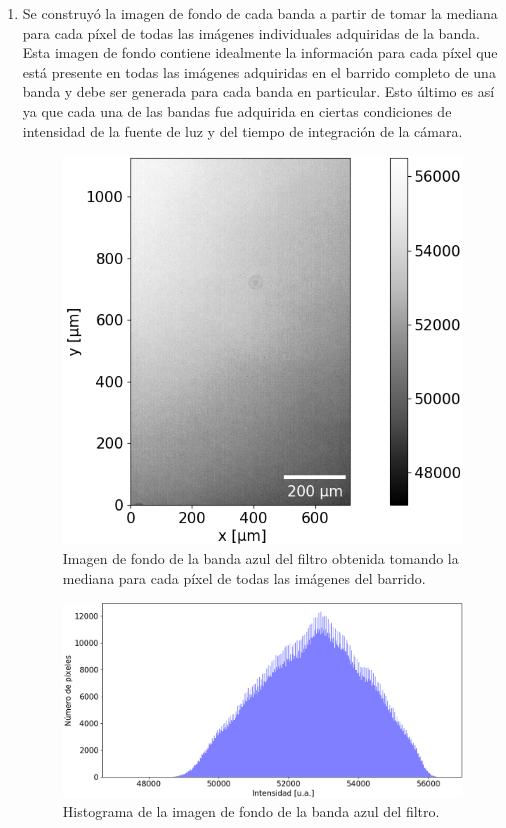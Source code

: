\begin{enumerate}
\justifying
	\item \href{https://github.com/jrr1984/defects_analysis/blob/master/MAIN/bg.py}{\faGithub} Se construyó la imagen de fondo de cada banda a partir de tomar la mediana para cada píxel de todas las imágenes individuales adquiridas de la banda. Esta imagen de fondo contiene idealmente la información para cada píxel que está presente en todas las imágenes adquiridas en el barrido completo de una banda y debe ser generada para cada banda en particular. Esto último es así ya que cada una de las bandas fue adquirida en ciertas condiciones de intensidad de la fuente de luz y del tiempo de integración de la cámara. 
	
\begin{figure}[H]
	\centering
      \includegraphics[scale=1.0]{Figs/defectosZEISS/bg_celeste.png}
\caption{Imagen de fondo de la banda azul del filtro obtenida tomando la mediana para cada píxel de todas las imágenes del barrido. }
\label{fig:bgazul}
\end{figure}

\begin{figure}[H]
	\centering
\includegraphics[scale=0.8]{Figs/defectosZEISS/hist_bg_azul.png}
\caption{Histograma de la imagen de fondo de la banda azul del filtro.}
\label{fig:histbgazul}
\end{figure}	


\end{enumerate}

